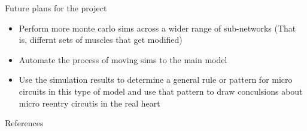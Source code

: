 \documentclass[aspectratio=43]{beamer}
\begin{document}
\begin{frame}{Future plans for the project}
	\begin{itemize}
		\item Perform more monte carlo sims across a wider range of 
			sub-networks (That is, differnt sets of muscles that get modified)
		\item Automate the process of moving sims to the main model
		\item Use the simulation results to determine a general rule or pattern 
			for micro circuits in this type of model and use that pattern to 
			draw conculsions about micro reentry circutis in the real heart 
	\end{itemize}
\end{frame}
\begin{frame}[allowframebreaks]{References}
	
	
\end{frame}
\end{document}
